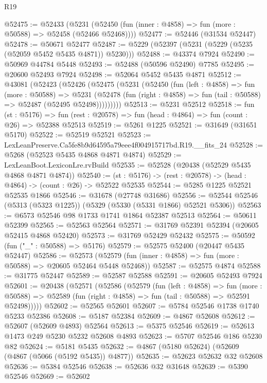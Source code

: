 \begin{lexlean}{R19}
\begin{coremodule}
@52475 := @52433
    (@5231 (@52450 (fun (inner : @4858) => fun (more : @50588) => @52458 (@52466 @52468))))
@52477 := @52446 (@31534 @52447)
@52478 := @50671 @52477
@52487 := @5229 (@52397 (@5231 (@5229 (@5235 (@52059 @5452 @5435 @4871)) @5230)))
@52488 := @43374 @7924
@52490 := @50969 @44784 @5448
@52493 := @52488 (@50596 @52490) @7785
@52495 := @20600 @52493 @7924
@52498 := @52064 @5452 @5435 @4871
@52512 := @43081
    (@52423
      (@52426
        (@52475
          (@5231
            (@52450
              (fun (left : @4858) =>
              fun (more : @50588) =>
              @5231
                (@52478
                  (fun (right : @4858) => fun (tail : @50588) => @52487 (@52495 @52498)))))))))
@52513 := @5231 @52512
@52518 := fun (st : @5176) =>
  fun (rest : @20578) => fun (head : @4864) => fun (count : @26) => @52388 @52513
@52519 := @5261 @1225
@52521 := @31649 (@31651 @5170)
@52522 := @52519 @52521
@52523 := LexLeanPreserve.Ca5fe8b9d64595a79eee4f004915717bd.R19.__fits_24
@52528 := @5268 (@52523 @5435 @4868 @4871 @4874)
@52529 := LexLeanBoot.LexiconLre.rvBuild
@52535 := @52528 (@20438 (@52529 @5435 @4868 @4871 @4874))
@52540 := (st : @5176) -> (rest : @20578) -> (head : @4864) -> (count : @26) -> @52522 @52535
@52544 := @5285 @1225 @52521 @52535 @1866
@52546 := @31678 (@27748 @31686)
@52556 := @52544 @52546 (@5313 (@5323 @1225)) (@5329 (@5330 (@5331 @1866) @52521 @5306))
@52563 := @6573 @52546 @98 @1733 @1741 @1864 @52387 @52513
@52564 := @50611 @52399
@52565 := @52563 @52564
@52571 := @31769 @52391 @52394 (@20605 @52415 @4868 @52420)
@52573 := @31769 @52429 @52432
@52575 := @50592 (fun ("_" : @50588) => @5176)
@52579 := @52575 @52400 (@20447 @5435 @52447)
@52586 := @52573 (@52579 (fun (inner : @4858) => fun (more : @50588) => @20605 @52464 @5448 @52468))
@52587 := @52575 @4874
@52588 := @31775 @52447
@52589 := @52587 @52588
@52591 := @20605 @52493 @7924
@52601 := @20438
    (@52571
      (@52586
        (@52579
          (fun (left : @4858) =>
          fun (more : @50588) =>
          @52589 (fun (right : @4858) => fun (tail : @50588) => @52591 @52498)))))
@52602 := @52565 @52601
@52607 := @5784 @52546 @1738 @1740 @5233 @52386
@52608 := @5187 @52384
@52609 := @4867 @52608
@52612 := @52607 (@52609 @4893) @52564
@52613 := @5375 @52546
@52619 := @52613 @1473 @249 @5230 @5232 @52608 @4893
@52623 := @5707 @52546 @186 @5230 @82
@52624 := @5181 @5435
@52632 := @4867 (@5180 @52624) (@52609 (@4867 (@5066 (@5192 @5435)) @4877))
@52635 := @52623 @52632 @32 @52608
@52636 := @5384 @52546
@52638 := @52636 @32 @31648
@52639 := @5390 @52546
@52669 := @52602

\end{coremodule}
\end{lexlean}
